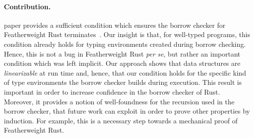 \paragraph{Contribution.}

 paper provides a sufficient condition
which ensures the borrow checker for Featherweight Rust
terminates~\cite{Pea21}.  Our insight is that, for well-typed
programs, this condition already holds for typing environments created
during borrow checking.  Hence, this is not a bug in Featherweight
Rust {\em per se}, but rather an important condition which was left
implicit.  Our approach shows that data structures are
\emph{linearizable} at run time and, hence, that our condition holds
for the specific kind of type environments the borrow checker builds
during execution.  This result is important in order to increase
confidence in the borrow checker of Rust.  Moreover, it provides a
notion of well-foundness for the recursion used in the borrow checker,
that future work can exploit in order to prove other properties by
induction.  For example, this is a necessary step towards a mechanical
proof of Featherweight Rust.
